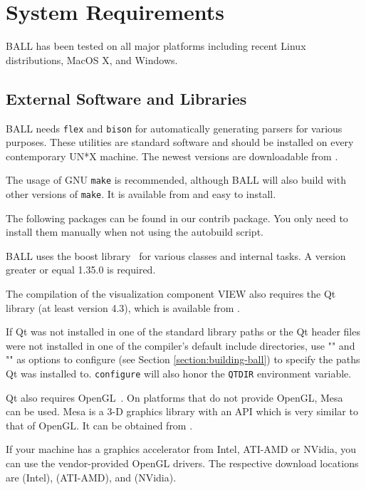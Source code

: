 \section{System Requirements}
\label{requirements}

BALL has been tested on all major platforms including recent Linux distributions, MacOS X, and Windows.


\subsection{External Software and Libraries}

BALL needs {\tt flex} and {\tt bison} for automatically generating parsers
for various purposes. These utilities are standard software and should be
installed on every contemporary UN*X machine. The newest versions are
downloadable from .

The usage of GNU {\tt make} is recommended, although BALL will also build with
other versions of {\tt make}. It is available from 
and easy to install.

The following packages can be found in our contrib package. You only need to install
them manually when not using the autobuild script.

BALL uses the boost library~\cite{boost} for various classes and internal tasks. A version greater 
or equal 1.35.0 is required.


The compilation of the visualization component VIEW also requires the Qt 
library (at least version 4.3), which is available from
.

If Qt was not installed in one of the standard library paths or the
Qt header files were not installed in one of the compiler's default
include directories, use \mbox{""} and
\mbox{""} as options to configure (see
Section \ref{section:building-ball}) to specify the paths Qt was installed
to. {\tt configure} will also honor the {\tt QTDIR} environment variable.

Qt also requires OpenGL~\cite{OpenGL}. On platforms that do not provide OpenGL,
Mesa~\cite{Mesa} can be used. Mesa is a 3-D graphics library with an API which
is very similar to that of OpenGL. It can be obtained from 
.

If your machine has a graphics accelerator from Intel, ATI-AMD or NVidia, you
can use the vendor-provided OpenGL drivers. The respective download locations
are  (Intel),
 (ATI-AMD), and
 (NVidia).

